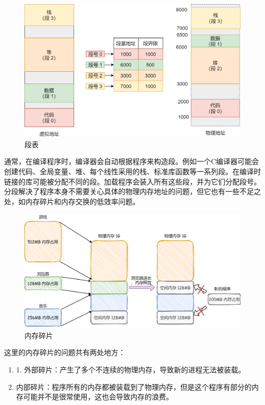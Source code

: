 \begin{figure}[H]
	\centering
	\includegraphics[scale=0.35]{img/C3/3-4/1.png}
	\caption{段表}
\end{figure}

通常，在编译程序时，编译器会自动根据程序来构造段。例如一个C编译器可能会创建代码、全局变量、堆、每个线性采用的栈、标准库函数等一系列段。在编译时链接的库可能被分配不同的段。加载程序会装入所有这些段，并为它们分配段号。 \\

分段解决了程序本身不需要关心具体的物理内存地址的问题，但它也有一些不足之处，如内存碎片和内存交换的低效率问题。

\begin{figure}[H]
	\centering
	\includegraphics[scale=0.25]{img/C3/3-4/2.png}
	\caption{内存碎片}
\end{figure}

这里的内存碎片的问题共有两处地方：

\begin{enumerate}
    \item 1. 外部碎片：产生了多个不连续的物理内存，导致新的进程无法被装载。
    
    \item 内部碎片：程序所有的内存都被装载到了物理内存，但是这个程序有部分的内存可能并不是很常使用，这也会导致内存的浪费。
\end{enumerate}

